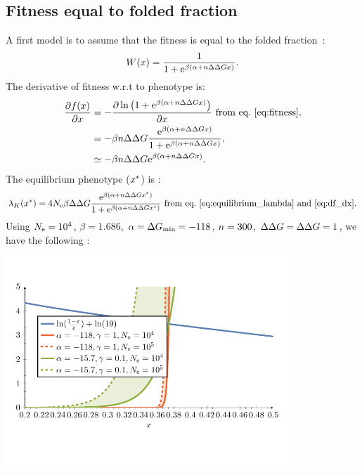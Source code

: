 \subsection{Fitness equal to folded fraction}
\label{subsec:fitness-equal-to-folded-fraction}

A first model is to assume that the fitness is equal to the folded fraction~\citep{Goldstein2013}:
\begin{gather}
    W (x) = \frac{1}{1 + \text{e}^{\beta(\alpha + n \Delta \Delta G x)}}. \label{eq:fitness}
\end{gather}
The derivative of fitness w.r.t to phenotype is:
\begin{align}
    \frac{\partial  f (x)}{\partial x}  & = - \frac{\partial \ln \left( 1 + \text{e}^{\beta(\alpha + n \Delta \Delta G x)} \right)}{\partial x} \text{ from eq.~\ref{eq:fitness}}, \\
    & = - \beta n \Delta \Delta G \frac{\text{e}^{\beta(\alpha + n \Delta \Delta G x)}}{1 + \text{e}^{\beta(\alpha + n \Delta \Delta G x)}} \label{eq:df_dx},\\
    & \simeq - \beta n \Delta \Delta G \text{e}^{\beta(\alpha + n \Delta \Delta G x)}.
\end{align}
The equilibrium phenotype ($x^{*}$) is :
\begin{gather}
    \lambda_{K}(x^{*}) = 4N_{\text{e}} \beta \Delta \Delta G \frac{\text{e}^{\beta(\alpha + n \Delta \Delta G x^{*})}}{1 + \text{e}^{\beta(\alpha + n \Delta \Delta G x^{*})}}  \text{ from eq.~\ref{eq:equilibrium_lambda} and~\ref{eq:df_dx}}.
\end{gather}
Using $N_{\text{e}}=10^4$, $\beta=1.686$, $\alpha = \Delta G_{\text{min}} = -118$, $n=300$, $\Delta \Delta G=\Delta \Delta G=1$, we have the following :
\begin{center}
    \includegraphics[width=0.8\textwidth, page=4] {analytical-relaxation}
\end{center}

